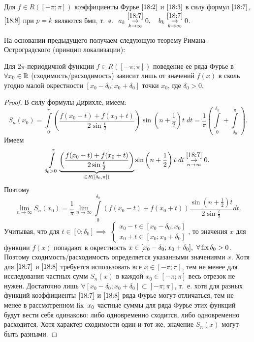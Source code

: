 \documentclass[../../main.tex]{subfiles}
\begin{document}
\begin{crl*}
	Для $f \in R([-\pi; \pi])$ коэффициенты Фурье $\eqref{18:2}$ и
	$\eqref{18:3}$ в силу формул $\eqref{18:7}$, $\eqref{18:8}$ при
	$p=k$ являются бмп, т.~е.
	$\ a_k \overset{\eqref{18:7}}{\underset
		{k \rightarrow \infty}{\rightarrow}} 0, \quad
	b_k \overset{\eqref{18:7}}{\underset
		{k \rightarrow \infty}{\rightarrow}} 0$.
\end{crl*}

\begin{rem}
	На основании предыдущего получаем следующую теорему 
	Римана-Остроградского (принцип локализации):
\end{rem}

\begin{thm}
	Для $2\pi$-периодичной функции $f\in R([-\pi;\pi])$ поведение
	ее ряда Фурье в $\forall x_0 \in \mathbb{R}$ (сходимость/расходимость) зависит
	лишь от значений $f(x)$ в сколь угодно малой окрестности
	$[x_0 - \delta_0; x_0 + \delta_0]$ точки $x_0$, где $\delta_0 > 0$.
\end{thm}

\begin{proof}
	В силу формулы Дирихле, имеем:
	\[S_n(x_0) = 
	\int\limits_{0}^{\pi}\left(\dfrac{f(x_0 - t) + f(x_0 + t)}
	{2\sin{\frac{t}{2}}}\right)\sin\left(n+\frac{1}{2}\right)t\;dt = 
	\dfrac{1}{\pi}\left(\int\limits_{0}^{\delta_0} + 
	\int\limits_{\delta_0}^{\pi}\right).\]
	Имеем
	\[\int\limits_{\delta_0 > 0}^{\pi} \underbrace{\left(\dfrac{f(x_0 - t) + 
	f(x_0 + t)}
	{2\sin{\frac{t}{2}}}\right)}_{\in R([\delta_0, \pi])} 
	\sin\left(n+\frac{1}{2}\right)t\;dt 
	 \overset{\eqref{18:7}}{\underset
		{n \rightarrow \infty}{\rightarrow}} 0.\]
	Поэтому
	\[\lim\limits_{n \rightarrow \infty}{S_n(x_0)} = \dfrac{1}{\pi}
	\lim\limits_{n \rightarrow \infty}{\int\limits_{0}^{\delta_0}
	(f(x_0 - t) + f(x_0 + t)) \dfrac{\sin(n+\frac{1}{2})t}{
	2\sin\frac{t}{2}}}dt.\]
	Учитывая, что для $t \in [0; \delta_0 ] \implies$
	$\begin{cases}
		x_0 - t \in [x_0 - \delta_0; x_0] 
		\\
		x_0 + t \in [x_0; x_0 + \delta_0] 
	\end{cases}$,
	то значения $x$ для функции $f(x)$
	попадают в окрестность
	 $x \in [x_0 - \delta_0; x_0 + \delta_0],\ \forall \operatorname{fix} \delta_0 > 0$.
	 Поэтому сходимость/расходимость определяется указанными значениями $x$.
	 Хотя для $\eqref{18:7}$ и $\eqref{18:8}$ требуется использовать все
	 $x \in [-\pi; \pi]$, тем не менее для исследования частных сумм 
	 $S_n(x)$ в каждой $x_0 \in [-\pi; \pi]$ весь отрезок не нужен.
	 Достаточно лишь $\forall [x_0 - \delta_0; x_0 + \delta_0] \subset
	 [-\pi; \pi]$, т.~е. хотя для разных функций коэффициенты 
	 $\eqref{18:7}$ и $\eqref{18:8}$ ряда Фурье могут отличаться, 
	 тем не менее в рассмотренном $\operatorname{fix}\ x_0$ частные суммы для
	 ряда Фурье
	 этих функций будут вести себя одинаково: либо одновременно сходится, 
	 либо одновременно расходится.
	 Хотя характер сходимости один и тот же, значение $S_n(x)$ могут быть
	 разными.
\end{proof}
\end{document}
